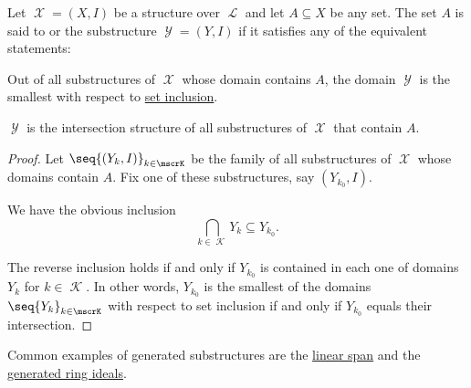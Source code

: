 \begin{definition}\label{def:first_order_generated_substructure}
  Let \( \mscrX = (X, I) \) be a structure over \( \mscrL \) and let \( A \subseteq X \) be any set. The set \( A \) is said to  or  the substructure \( \mscrY = (Y, I) \) if it satisfies any of the equivalent statements:
  \begin{thmenum}
     Out of all substructures of \( \mscrX \) whose domain contains \( A \), the domain \( \mscrY \) is the smallest with respect to \hyperref[def:subset]{set inclusion}.

     \( \mscrY \) is the intersection structure of all substructures of \( \mscrX \) that contain \( A \).
  \end{thmenum}
\end{definition}
\begin{proof}
  Let \( \seq{ (Y_k, I) }_{k \in \mscrK} \) be the family of all substructures of \( \mscrX \) whose domains contain \( A \). Fix one of these substructures, say \( (Y_{k_0}, I) \).

  We have the obvious inclusion
  \begin{equation*}
    \bigcap_{k \in \mscrK} Y_k \subseteq Y_{k_0}.
  \end{equation*}

  The reverse inclusion holds if and only if \( Y_{k_0} \) is contained in each one of domains \( Y_k \) for \( k \in \mscrK \). In other words, \( Y_{k_0} \) is the smallest of the domains \( \seq{ Y_k }_{k \in \mscrK} \) with respect to set inclusion if and only if \( Y_{k_0} \) equals their intersection.
\end{proof}

\begin{example}\label{ex:def:first_order_generated_substructure}
  Common examples of generated substructures are the \hyperref[def:linear_span]{linear span} and the \hyperref[def:generated_ring_ideal]{generated ring ideals}.
\end{example}

